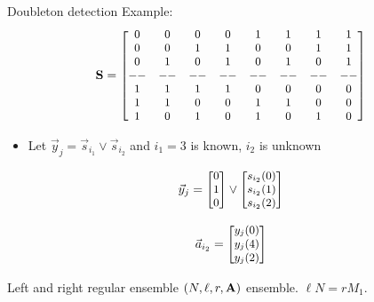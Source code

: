 \begin{frame}{Doubleton detection}
Example:
\begin{align*}
{
\small
\mathbf{S}=
 \begin{bmatrix}
		0      & 0   & 0 & 0 & 1 & 1 & 1 & 1 \\
		0      & 0   & 1 & 1 & 0 & 0 & 1 & 1 \\
		0      & 1   & 0 & 1 & 0 & 1 & 0 & 1 \\
		-- & -- & -- & -- & -- & -- & -- & -- \\
		1      & 1   & 1 & 1 & 0 & 0 & 0 & 0 \\
		1      & 1   & 0 & 0 & 1 & 1 & 0 & 0 \\
		1      & 0   & 1 & 0 & 1 & 0 & 1 & 0 
\end{bmatrix}
}
\end{align*}
\pause
\begin{itemize}
\item Let $\vec{y}_j=\vec{s}_{i_1}\vee \vec{s}_{i_2}$ and $i_1=3$ is known, $i_2$ is unknown
\end{itemize}
\begin{align*}
{
\small
\vec{y}_j=
 \begin{bmatrix}
	 0  \\
	 1 \\
  	 0  
\end{bmatrix} \vee
 \begin{bmatrix}
	  s_{i_2}(0) \\
	  s_{i_2}(1)\\
	  s_{i_2}(2) 
\end{bmatrix}
}
\end{align*}

\pause
\[
{\small
\vec{a}_{i_2}= 
\begin{bmatrix}
	  y_{j}(0) \\
	  y_{j}(4) \\
	  y_{j}(2) 
\end{bmatrix}
}
\]

\end{frame}


\begin{frame}{Left and right regular ensemble}
$(N,\ell,r,\mathbf{A})$ ensemble. $\ell N=rM_1$. 

\vspace{5ex}
\centering
\resizebox{0.55\textwidth}{!}{}
\end{frame}

